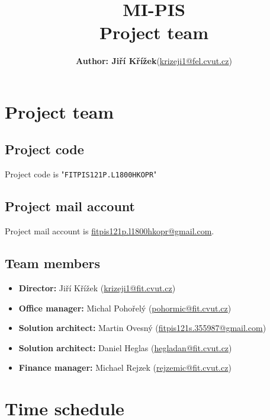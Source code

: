 \documentclass[12pt]{article}
\begin{document}
\title{MI-PIS
\\\small{Project team}
} 

\dmyyyydate


\author{
\begin{tabular}{ l r } 
  \bf Author: Jiří Křížek & (\url{krizeji1@fel.cvut.cz})
\end{tabular}}

\maketitle


\section{Project team}
  \subsection{Project code}
  Project code is "\texttt{FITPIS121P.L1800HKOPR}"
  
  \subsection{Project mail account}
  Project mail account is \url{fitpis121p.l1800hkopr@gmail.com}.
  
  \subsection{Team members}
    \begin{itemize}
      \item{{\bf Director:} Jiří Křížek (\url{krizeji1@fit.cvut.cz})}
      \item{{\bf Office manager:} Michal Pohořelý (\url{pohormic@fit.cvut.cz})}
      \item{{\bf Solution architect:} Martin Ovesný (\url{fitpis121s.355987@gmail.com})}
      \item{{\bf Solution architect:} Daniel Heglas (\url{hegladan@fit.cvut.cz})}
      \item{{\bf Finance manager:} Michael Rejzek (\url{rejzemic@fit.cvut.cz})}
    \end{itemize}

\section{Time schedule}
\end{document}
